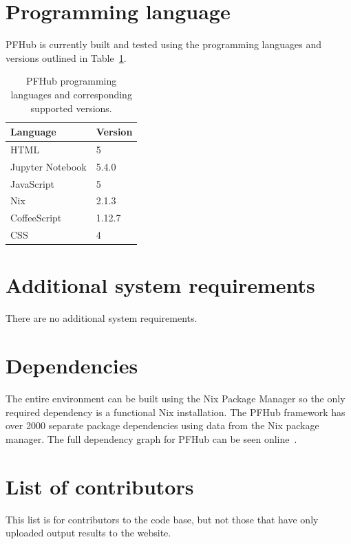 \documentclass{jors}
\begin{document}
\section*{Programming language}

PFHub is currently built and tested using the programming languages
and versions outlined in Table~\ref{tab:versions}.

\begin{table}[h!]
  \centering
  \caption{PFHub programming languages and corresponding supported
    versions.}
  \begin{tabular}{|l|l|}
    \hline
    Language         & Version \\
    \hline
    HTML             & 5       \\
    Jupyter Notebook & 5.4.0   \\
    JavaScript       & 5       \\
    Nix              & 2.1.3   \\
    CoffeeScript     & 1.12.7  \\
    CSS              & 4       \\
    \hline
  \end{tabular}
  \label{tab:versions}
\end{table}


\section*{Additional system requirements}

There are no additional system requirements.

\section*{Dependencies}

The entire environment can be built using the Nix Package Manager so
the only required dependency is a functional Nix installation. The
PFHub framework has over 2000 separate package dependencies using
data from the Nix package manager. The full dependency graph for PFHub
can be seen online~\cite{dependencies}.

\section*{List of contributors}

This list is for contributors to the code base, but not those that
have only uploaded output results to the website.
\end{document}
